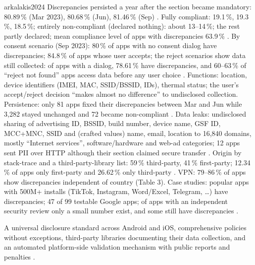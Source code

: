 \begin{papercard}{arkalakis2024}
 Discrepancies persisted a year after the section became mandatory: 80.89\,\% (Mar 2023), 80.68\,\% (Jun), 81.46\,\% (Sep) . Fully compliant: 19.1\,\%, 19.3\,\%, 18.5\,\%; entirely non-compliant (declared nothing): about 13--14\,\%; the rest partly declared; mean compliance level of apps with discrepancies 63.9\,\% . By consent scenario (Sep 2023): 80\,\% of apps with no consent dialog have discrepancies; 84.8\,\% of apps whose user accepts; the reject scenarios show data still collected: of apps with a dialog, 78.61\,\% have discrepancies, and 60--63\,\% of ``reject not found'' apps access data before any user choice . Functions: location, device identifiers (IMEI, MAC, SSID/BSSID, IDs), thermal status; the user's accept/reject decision ``makes almost no difference'' to undisclosed collection. Persistence: only 81 apps fixed their discrepancies between Mar and Jun while 3,282 stayed unchanged and 72 became non-compliant . Data leaks: undisclosed sharing of advertising ID, BSSID, build number, device name, GSF ID, MCC+MNC, SSID and (crafted values) name, email, location to 16,840 domains, mostly ``Internet services'', software/hardware and web-ad categories; 12 apps sent PII over HTTP although their section claimed secure transfer . Origin by stack-trace and a third-party-library list: 59\,\% third-party, 41\,\% first-party; 12.34\,\% of apps only first-party and 26.62\,\% only third-party . VPN: 79--86\,\% of apps show discrepancies independent of country (Table 3). Case studies: popular apps with 500M+ installs (TikTok, Instagram, Word/Excel, Telegram, \ldots) have discrepancies; 47 of 99 testable Google apps; of apps with an independent security review only a small number exist, and some still have discrepancies .

 A universal disclosure standard across Android and iOS, comprehensive policies without exceptions, third-party libraries documenting their data collection, and an automated platform-side validation mechanism with public reports and penalties .


\end{papercard}
